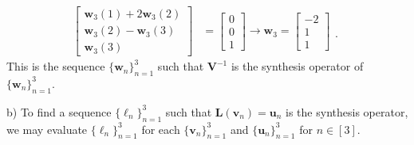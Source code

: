\documentclass[12pt]{amsart}
\newcommand{\1}{\mathbbm{1}}
\numberwithin{equation}{section}
\numberwithin{Theorem}{section}
\theoremstyle{plain} %
\theoremstyle{definition}
\theoremstyle{remark}
\begin{document}
\begin{enumerate}[1.]
\begin{align*}
\begin{bmatrix}
		\mathbf{w}_3(1) + 2\mathbf{w}_3(2) \\
		\mathbf{w}_3(2) -  \mathbf{w}_3(3) \\
		\mathbf{w}_3(3)
	\end{bmatrix}
	&= 
	\begin{bmatrix} 0 \\ 0 \\ 1 \end{bmatrix}
	\rightarrow
	\mathbf{w}_3 =
	\begin{bmatrix} -2 \\ 1 \\ 1 \end{bmatrix}
	\begin{matrix} \\ \\ . \end{matrix}
\end{align*}
This is the sequence \(\{\mathbf{w}_{n}\}_{n=1}^{3}\) such that \(\mathbf{V}^{-1}\) is the synthesis operator of \(\{\mathbf{w}_{n}\}_{n=1}^{3}\).


\clearpage
b)
To find a sequence 
\(\{\boldsymbol{\ell}_{n}\}_{n=1}^{3}\) such that 
\(\mathbf{L}(\mathbf{v}_{n}) = \mathbf{u}_{n}\) is the synthesis operator,
we may evaluate 
\(\{\boldsymbol{\ell}_{n}\}_{n=1}^{3}\)
for each 
\(\{\mathbf{v}_{n}\}_{n=1}^{3}\) and
\(\{\mathbf{u}_{n}\}_{n=1}^{3}\) for $n\in[3]$.


\end{enumerate}
\end{document}
